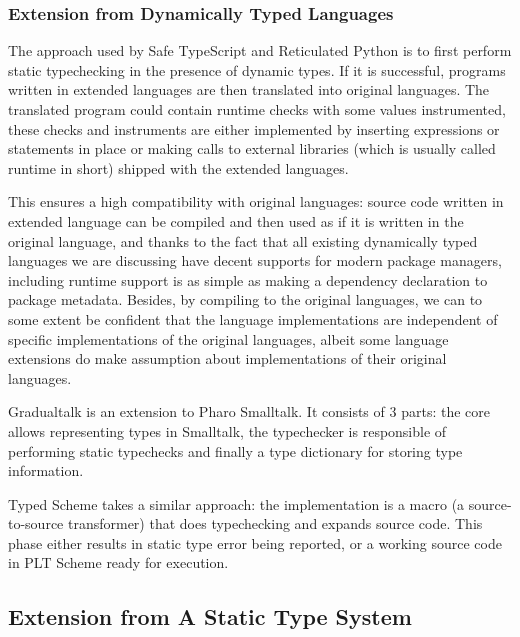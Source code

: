 \subsubsection{Extension from Dynamically Typed Languages}

The approach used by Safe TypeScript and Reticulated Python
is to first perform static typechecking in the presence of dynamic types.
If it is successful, programs written in extended languages are then translated into original languages.
The translated program could contain runtime checks with some values instrumented,
these checks and instruments are either implemented by inserting expressions or statements in place or
making calls to external libraries (which is usually called runtime in short) shipped with
the extended languages.

This ensures a high compatibility with original languages: source code written in extended language
can be compiled and then used as if it is written in the original language, and thanks to the fact
that all existing dynamically typed languages
we are discussing have decent supports for modern package managers,
including runtime support is as simple as making a dependency declaration to package metadata.
Besides, by compiling to the original languages,
we can to some extent be confident that the language implementations
are independent of specific implementations of the original languages,
albeit some language extensions do make assumption about implementations of their original languages.




Gradualtalk is an extension to Pharo Smalltalk. It consists of 3 parts:
the core allows representing types in Smalltalk, the typechecker
is responsible of performing static typechecks and finally
a type dictionary for storing type information.

Typed Scheme takes a similar approach: the implementation is a macro
(a source-to-source transformer) that does typechecking and expands source code.
This phase either results in static type error being reported,
or a working source code in PLT Scheme ready for execution.

\subsection{Extension from A Static Type System}


